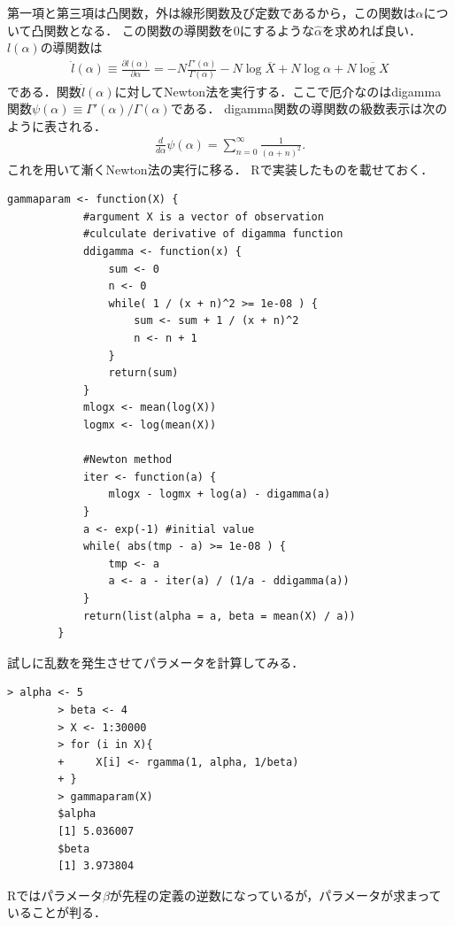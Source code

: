 \documentclass[a4j,papersize,disablejfam,slide,14pt]{jsarticle}
\def\Log#1{\operatorname{log} #1} %
\begin{document}
    第一項と第三項は凸関数，外は線形関数及び定数であるから，この関数は$\alpha$について凸関数となる．
    この関数の導関数を$0$にするような$\hat{\alpha}$を求めれば良い．$l(\alpha)$の導関数は
    \begin{align}
    	\dot{l}(\alpha) \equiv \frac{\partial l(\alpha)}{\partial \alpha} 
        = -N \frac{\Gamma'(\alpha)}{\Gamma(\alpha)} - N \Log{\overline{X}} + N \Log{\alpha} + N \overline{\Log{X}}
    \end{align}
    である．関数$\dot{l}(\alpha)$に対して{\rm Newton}法を実行する．ここで厄介なのは{\rm digamma}関数$\psi(\alpha) \equiv \Gamma'(\alpha)/\Gamma(\alpha)$である．
    {\rm digamma}関数の導関数の級数表示は次のように表される．
    \begin{align}
    	\frac{d}{d \alpha} \psi(\alpha) = \sum_{n=0}^{\infty} \frac{1}{(\alpha + n)^2}.
    \end{align}
    これを用いて漸く{\rm Newton}法の実行に移る．
    {\rm R}で実装したものを載せておく．
    \begin{lstlisting}[style=customR]
    	gammaparam <- function(X) {
        	#argument X is a vector of observation
        	#culculate derivative of digamma function
            ddigamma <- function(x) {
            	sum <- 0
                n <- 0
                while( 1 / (x + n)^2 >= 1e-08 ) {
                	sum <- sum + 1 / (x + n)^2
                    n <- n + 1
                }
                return(sum)
            }
            mlogx <- mean(log(X))
            logmx <- log(mean(X))
            
            #Newton method
            iter <- function(a) {
            	mlogx - logmx + log(a) - digamma(a)
            }
            a <- exp(-1) #initial value
            while( abs(tmp - a) >= 1e-08 ) {
            	tmp <- a
            	a <- a - iter(a) / (1/a - ddigamma(a))
            }
            return(list(alpha = a, beta = mean(X) / a)) 
        }
    \end{lstlisting}
    試しに乱数を発生させてパラメータを計算してみる．
    \begin{lstlisting}[style=customR]
    	> alpha <- 5
		> beta <- 4
		> X <- 1:30000
		> for (i in X){
		+     X[i] <- rgamma(1, alpha, 1/beta)
		+ }
		> gammaparam(X)
		$alpha
		[1] 5.036007
        $beta
        [1] 3.973804
	\end{lstlisting}
    {\rm R}ではパラメータ$\beta$が先程の定義の逆数になっているが，パラメータが求まっていることが判る．
    
\end{document}
